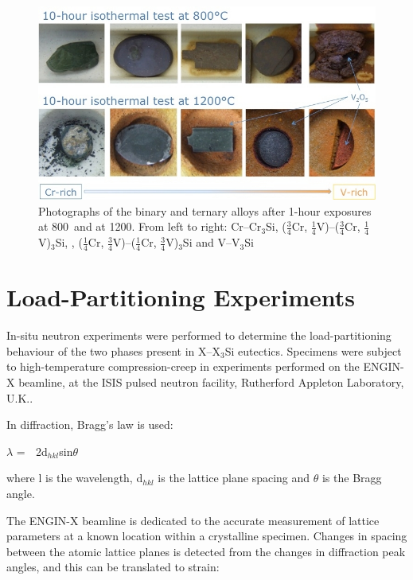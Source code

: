 %
\begin{landscape}
\begin{figure}[htbp]
\begin{center}
\includegraphics[width=22cm]{oxidation}
\caption{Photographs of the binary and ternary alloys after 1-hour exposures at 800\celsius\ and at 1200\celsius.   From left to right: Cr--Cr$_3$Si, ($\frac{3}{4}$Cr, $\frac{1}{4}$V)--($\frac{3}{4}$Cr, $\frac{1}{4}$V)$_3$Si, , ($\frac{1}{4}$Cr, $\frac{3}{4}$V)--($\frac{1}{4}$Cr, $\frac{3}{4}$V)$_3$Si and V--V$_3$Si }\label{fig:oxidation}
\end{center}
\end{figure}
\end{landscape}
%


\section{Load-Partitioning Experiments}

In-situ neutron experiments were performed to determine the load-partitioning behaviour of the two phases present in X--X$_3$Si eutectics.  Specimens were subject to high-temperature compression-creep in experiments performed on the ENGIN-X beamline, at the ISIS pulsed neutron facility, Rutherford Appleton Laboratory, U.K..  

In diffraction, Bragg's law is used: 

\hspace{5cm}		$\lambda$ = 􏰄 2d$_{hkl}$sin$\theta$

where l is the wavelength, d$_{hkl}$ is the lattice plane spacing and $\theta$ is the Bragg angle.  

The ENGIN-X beamline is dedicated to the accurate measurement of lattice parameters at a known location within a crystalline specimen.  Changes in spacing between the atomic lattice planes is detected from the changes in diffraction peak angles, and this can be translated to strain:

